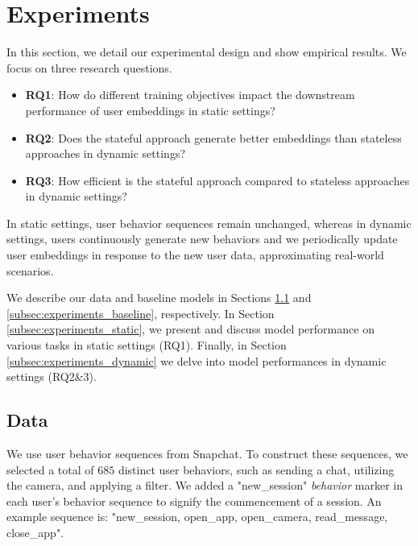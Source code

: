 \documentclass{article}
\begin{document}
\section{Experiments}
In this section, we detail our experimental design and show empirical results. We focus on three research questions. 
\begin{itemize}
    \item \textbf{RQ1}: How do different training objectives impact the downstream performance of user embeddings in static settings? 
    \item \textbf{RQ2}: Does the stateful approach generate better embeddings than stateless approaches in dynamic settings?
    \item \textbf{RQ3}: How efficient is the stateful approach compared to stateless approaches in dynamic settings?
\end{itemize}

In static settings, user behavior sequences remain unchanged, whereas in dynamic settings, users continuously generate new behaviors and we periodically update user embeddings in response to the new user data, approximating real-world scenarios.

We describe our data and baseline models in Sections \ref{subsec:experiments_data} and \ref{subsec:experiments_baseline}, respectively. In Section \ref{subsec:experiments_static}, we present and discuss model performance on various tasks in static settings (RQ1). Finally, in Section \ref{subsec:experiments_dynamic} we delve into model performances in dynamic settings (RQ2\&3).


\subsection{Data}
\label{subsec:experiments_data}

We use user behavior sequences from Snapchat. 
To construct these sequences, we selected a total of $685$ distinct user behaviors, such as sending a chat, utilizing the camera, and applying a filter. We added a "new\_session" \textit{behavior} marker in each user's behavior sequence to signify the commencement of a session. An example sequence is: "new\_session, open\_app, open\_camera, read\_message, close\_app".
\end{document}
